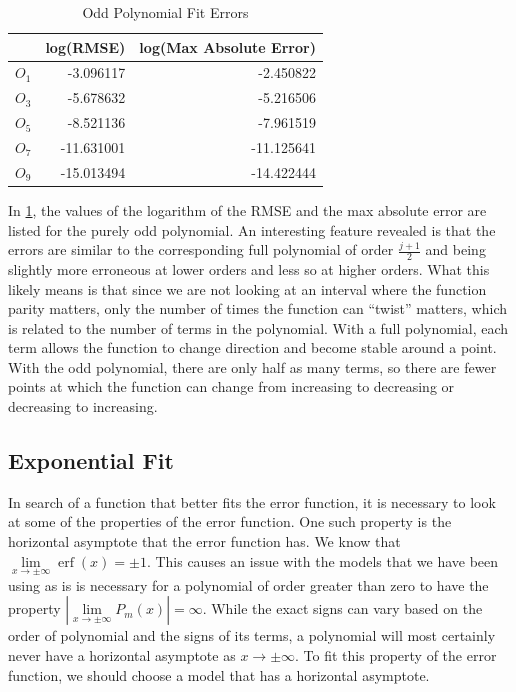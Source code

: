 \documentclass[10pt,a4paper]{article}
\DeclareMathOperator\erf{erf}
\begin{document}
\begin{multicols*}{2}
\begin{table}[H]
\begin{tabular}{l|rr}
     & \multicolumn{1}{c}{log(RMSE)} & \multicolumn{1}{c}{log(Max Absolute Error)} \\ \hline
$O_1$ & -3.096117             & -2.450822                           \\
$O_3$ & -5.678632            & -5.216506                           \\
$O_5$ & -8.521136            & -7.961519                           \\
$O_7$ & -11.631001           & -11.125641                          \\
$O_9$ & -15.013494             & -14.422444                          
\end{tabular}
\caption{Odd Polynomial Fit Errors}
\label{table: odderrors}
\end{table}

In \cref{table: odderrors}, the values of the logarithm of the RMSE and the max absolute error are listed for the purely odd polynomial. An interesting feature revealed is that the errors are similar to the corresponding full polynomial of order $\frac{j+1}{2}$ and being slightly more erroneous at lower orders and less so at higher orders. What this likely means is that since we are not looking at an interval where the function parity matters, only the number of times the function can ``twist'' matters, which is related to the number of terms in the polynomial. With a full polynomial, each term allows the function to change direction and become stable around a point. With the odd polynomial, there are only half as many terms, so there are fewer points at which the function can change from increasing to decreasing or decreasing to increasing.

\subsection*{Exponential Fit}

In search of a function that better fits the error function, it is necessary to look at some of the properties of the error function. One such property is the horizontal asymptote that the error function has. We know that $\lim\limits_{x \to \pm \infty} \erf{(x)} = \pm1$. This causes an issue with the models that we have been using as is is necessary for a polynomial of order greater than zero to have the property $\left| \lim\limits_{x \to \pm \infty} P_m(x)  \right| = \infty$. While the exact signs can vary based on the order of polynomial and the signs of its terms, a polynomial will most certainly never have a horizontal asymptote as $x \to \pm \infty$. To fit this property of the error function, we should choose a model that has a horizontal asymptote.


\end{multicols*}
\end{document}
